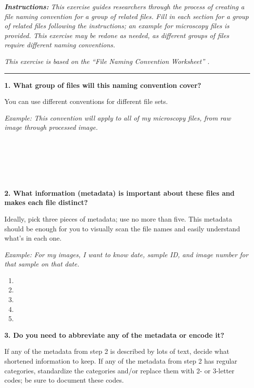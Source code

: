 \documentclass[
]{book}
\providecommand{\tightlist}{%
  \setlength{\itemsep}{0pt}\setlength{\parskip}{0pt}}
\begin{document}
\textbf{\emph{Instructions:}} \emph{This exercise guides researchers through the process of creating a file naming convention for a group of related files. Fill in each section for a group of related files following the instructions; an example for microscopy files is provided. This exercise may be redone as needed, as different groups of files require different naming conventions.}

\emph{This exercise is based on the ``File Naming Convention Worksheet'' \citet{briney_file_2020}.}

\begin{center}\rule{0.5\linewidth}{0.5pt}\end{center}

\textbf{1. What group of files will this naming convention cover?}

You can use different conventions for different file sets.

\emph{Example: This convention will apply to all of my microscopy files, from raw image through processed image.}

~

~

~

\textbf{2. What information (metadata) is important about these files and makes each file distinct?}

Ideally, pick three pieces of metadata; use no more than five. This metadata should be enough for you to visually scan the file names and easily understand what's in each one.

\emph{Example: For my images, I want to know date, sample ID, and image number for that sample on that date.}

\begin{enumerate}
\def\labelenumi{\arabic{enumi}.}
\tightlist
\item
\item
\item
\item
\item
\end{enumerate}

\textbf{3. Do you need to abbreviate any of the metadata or encode it?}

If any of the metadata from step 2 is described by lots of text, decide what shortened information to keep. If any of the metadata from step 2 has regular categories, standardize the categories and/or replace them with 2- or 3-letter codes; be sure to document these codes.
\end{document}
